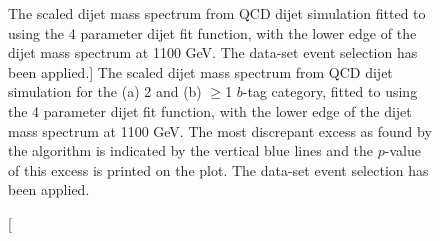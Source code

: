 \begin{figure}[!htb]
  \begin{center}
   \captionsetup[subfigure]{aboveskip=0pt,justification=centering}
  \end{center}
  \vspace{-1em}
  \caption
      [The scaled dijet mass spectrum from QCD dijet simulation
        fitted to using the 4 parameter dijet fit function, with the lower edge of the dijet mass spectrum at 1100 GeV.
        The \summer{} data-set event selection has been applied.]
      {The scaled dijet mass spectrum from QCD dijet simulation for the (a) 2 and (b) $\geq$1 $b$-tag category,
        fitted to using the 4 parameter dijet fit function, with the lower edge of the dijet mass spectrum at 1100 GeV.
        The most discrepant excess as found by the \bh{} algorithm is indicated by the vertical blue lines and the \mbox{$p$-value} of this excess is printed on the plot.         
        The \summer{} data-set event selection has been applied.}
 \label{fig:Short_4para_1100_figure1}
\end{figure}
%
%
